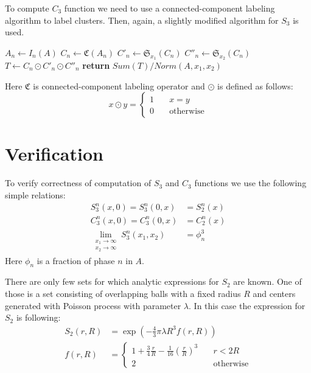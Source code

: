 \documentclass[1p]{elsarticle}
\begin{document}
To compute $C_3$ function we need to use a connected-component labeling
algorithm \cite{4728561,PhysRevB.14.3438} to label clusters. Then, again, a
slightly modified algorithm for $S_3$ is used.
\begin{algorithmic}[1]
  \State $A_n \gets I_n (A)$
  \State $C_n \gets \mathfrak{C}(A_n)$
  \State $C'_n \gets \mathfrak{S}_{x_1}(C_n)$
  \State $C''_n \gets \mathfrak{S}_{x_2}(C_n)$
  \State $T \gets C_n \odot C'_n \odot C''_n$
  \State \textbf{return} $Sum(T) / Norm(A, x_1, x_2)$
  \EndProcedure
\end{algorithmic}
Here $\mathfrak{C}$ is connected-component labeling operator and $\odot$ is
defined as follows:
\begin{equation}
  x \odot y = \left\{
  \begin{array}{ll}
    1 & \quad x = y \\
    0 & \quad \text{otherwise}
  \end{array}
  \right.
\end{equation}

\section{Verification}
To verify correctness of computation of $S_3$ and $C_3$ functions we use the
following simple relations:
\begin{align}
  S_3^n (x, 0) = S_3^n (0, x) &= S_2^n(x) \\
  C_3^n (x, 0) = C_3^n (0, x) &= C_2^n(x) \\
  \lim_{\substack{x_1 \to \infty \\ x_2 \to \infty}} S_3^n (x_1, x_2) &= \phi_n^3
\end{align}
Here $\phi_n$ is a fraction of phase $n$ in $A$.

There are only few sets for which analytic expressions for $S_2$ are known. One
of those is a set consisting of overlapping balls with a fixed radius $R$ and
centers generated with Poisson process with parameter $\lambda$. In this case
the expression for $S_2$ is following:
\begin{equation}
  \begin{aligned}
    S_2(r, R) &= \exp(-\frac{4}{3}\pi\lambda R^3 f(r, R)) \\
    f(r, R) &= \left\{
    \begin{array}{ll}
      1 + \frac{3}{4} \frac{r}{R} - \frac{1}{16} (\frac{r}{R})^3 & \quad r < 2R \\
      2 & \quad \text{otherwise}
    \end{array}
    \right.
  \end{aligned}
  \label{eq:s2-balls}
\end{equation}
\end{document}
